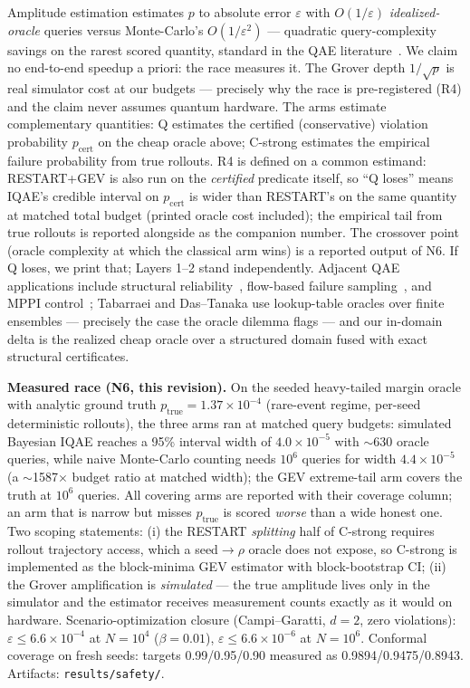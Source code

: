 \documentclass[conference,10pt]{IEEEtran}
\begin{document}
Amplitude estimation estimates $p$ to absolute error $\varepsilon$ with
$O(1/\varepsilon)$ \emph{idealized-oracle} queries versus Monte-Carlo's
$O(1/\varepsilon^2)$ --- quadratic query-complexity savings on the rarest
scored quantity, standard in the QAE literature~\cite{iqae,tabarraei,mppi}. We
claim no end-to-end speedup a priori: the race measures it. The Grover depth
$1/\sqrt{p}$ is real simulator cost at our budgets --- precisely why the race
is pre-registered (R4) and the claim never assumes quantum hardware. The arms
estimate complementary quantities: Q estimates the certified (conservative)
violation probability $p_{\mathrm{cert}}$ on the cheap oracle above; C-strong
estimates the empirical failure probability from true rollouts. R4 is defined
on a common estimand: RESTART+GEV is also run on the \emph{certified}
predicate itself, so ``Q loses'' means IQAE's credible interval on
$p_{\mathrm{cert}}$ is wider than RESTART's on the same quantity at matched
total budget (printed oracle cost included); the empirical tail from true
rollouts is reported alongside as the companion number. The crossover point
(oracle complexity at which the classical arm wins) is a reported output of
N6. If Q loses, we print that; Layers 1--2 stand independently. Adjacent QAE applications include structural
reliability~\cite{tabarraei}, flow-based failure sampling~\cite{quantfp}, and
MPPI control~\cite{mppi}; Tabarraei and Das--Tanaka use lookup-table oracles
over finite ensembles --- precisely the case the oracle dilemma flags --- and
our in-domain delta is the realized cheap oracle over a structured domain fused
with exact structural certificates.

\textbf{Measured race (N6, this revision).} On the seeded heavy-tailed margin
oracle with analytic ground truth $p_{\mathrm{true}} = 1.37\times10^{-4}$
(rare-event regime, per-seed deterministic rollouts), the three arms ran at
matched query budgets: simulated Bayesian IQAE reaches a 95\% interval width
of $4.0\times10^{-5}$ with $\sim$630 oracle queries, while naive Monte-Carlo
counting needs $10^{6}$ queries for width $4.4\times10^{-5}$ (a
$\sim$1587$\times$ budget ratio at matched width); the GEV extreme-tail arm
covers the truth at $10^{6}$ queries. All covering arms are reported with
their coverage column; an arm that is narrow but misses $p_{\mathrm{true}}$
is scored \emph{worse} than a wide honest one. Two scoping statements: (i) the
RESTART \emph{splitting} half of C-strong requires rollout trajectory access,
which a seed$\to\rho$ oracle does not expose, so C-strong is implemented as
the block-minima GEV estimator with block-bootstrap CI; (ii) the Grover
amplification is \emph{simulated} --- the true amplitude lives only in the
simulator and the estimator receives measurement counts exactly as it would
on hardware. Scenario-optimization closure (Campi--Garatti, $d=2$, zero
violations): $\varepsilon \le 6.6\times10^{-4}$ at $N=10^4$
($\beta=0.01$), $\varepsilon \le 6.6\times10^{-6}$ at $N=10^6$. Conformal
coverage on fresh seeds: targets 0.99/0.95/0.90 measured as
0.9894/0.9475/0.8943. Artifacts: \texttt{results/safety/}.
\end{document}
